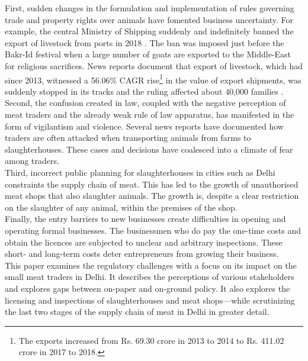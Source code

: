 \documentclass[a4paper, 12pt, twoside]{article}
\begin{document}
First, sudden changes in the formulation and implementation of rules governing trade and property rights over animals have fomented business uncertainty. For example, the central Ministry of Shipping suddenly and indefinitely banned the export of livestock from ports in 2018 \parencite{kateshiyanews}. The ban was imposed just before the Bakr-Id festival when a large number of goats are exported to the Middle-East for religious sacrifices. News reports document that export of livestock, which had since 2013, witnessed a 56.06\% CAGR rise\footnote { The exports increased from Rs. 69.30 crore in 2013 to 2014 to Rs. 411.02 crore in 2017 to 2018.} in the value of export shipments, was suddenly stopped in its tracks and the ruling affected about 40,000 families \parencite{hindunews}. \\

Second, the confusion created in law, coupled with the negative perception of meat traders and the already weak rule of law apparatus, has manifested in the form of vigilantism and violence. Several news reports have documented how traders are often attacked when transporting animals from farms to slaughterhouses. These cases and decisions have coalesced into a climate of fear among traders.\\

Third, incorrect public planning for slaughterhouses in cities such as Delhi constraints the supply chain of meat. This has led to the growth of unauthorised meat shops that also slaughter animals. The growth is, despite a clear restriction on the slaughter of any animal, within the premises of the shop. \\

Finally, the entry barriers to new businesses create difficulties in opening and operating formal businesses. The businessmen who do pay the one-time costs and obtain the licences are subjected to unclear and arbitrary inspections. These short- and long-term costs deter entrepreneurs from growing their business. \\

This paper examines the regulatory challenges with a focus on its impact on the small meat traders in Delhi. It describes the perceptions of various stakeholders and explores gaps between on-paper and on-ground policy. It also explores the licensing and inspections of slaughterhouses and meat shops—while scrutinizing the last two stages of the supply chain of meat in Delhi in greater detail.\\
\end{document}
